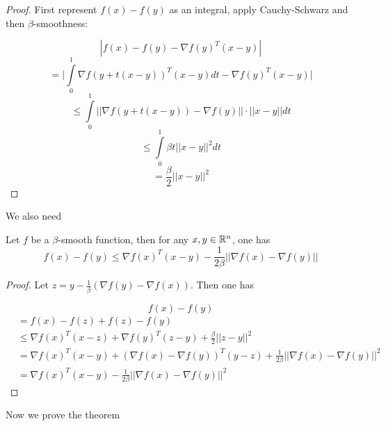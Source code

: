\begin{proof}
First represent $f(x) - f(y)$ as an integral, apply Cauchy-Schwarz and then $\beta$-smoothness:

$$|f(x) - f(y) - \nabla f(y)^T(x-y)|$$
$$= \big|\int\limits_{0}^1 \nabla f(y + t(x-y))^T(x-y)dt - \nabla f(y)^T(x-y)\big|$$
$$\leq  \int\limits_{0}^1 ||\nabla f(y + t(x-y)) - \nabla f(y)||\cdot ||x-y||dt$$
$$\leq \int\limits_{0}^1 \beta t||x-y||^2dt$$
$$= \frac{\beta}{2}||x-y||^2$$
\end{proof}

We also need

\begin{lemma} \label{lm2}
Let $f$ be a $\beta$-smooth function, then for any $x,y \in \mathbb{R}^n$, one has
$$f(x) - f(y)\leq \nabla f(x)^T(x-y) - \frac{1}{2\beta}||\nabla f(x) - \nabla f(y)||$$
\end{lemma}

\begin{proof}
Let $z = y - \frac{1}{\beta}(\nabla f(y) - \nabla f(x))$.  Then one has

$$f(x) - f(y)$$
\begin{align}
    &= f(x) - f(z) + f(z) - f(y) \\
    &\leq \nabla f(x)^T(x-z) + \nabla f(y)^T(z-y) + \frac{\beta}{2}||z-y||^2 \\
    &= \nabla f(x)^T(x-y) + (\nabla f(x) - \nabla f(y))^T(y-z) + \frac{1}{2\beta}||\nabla f(x) - \nabla f(y)||^2 \\
    &= \nabla f(x)^T(x-y) - \frac{1}{2\beta} ||\nabla f(x) - \nabla f(y)||^2
\end{align}

\end{proof}

Now we prove the theorem

